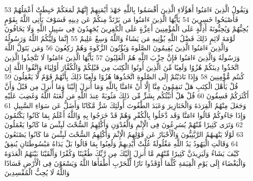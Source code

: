 {\tiny\colorbox{cl_aya}{53}} وَيَقُولُ الَّذِينَ ءَامَنُوا أَهَؤُلَاءِ الَّذِينَ أَقْسَمُوا بِاللَّهِ جَهْدَ أَيْمَنِهِمْ إِنَّهُمْ لَمَعَكُمْ حَبِطَتْ أَعْمَلُهُمْ فَأَصْبَحُوا خَسِرِينَ
{\tiny\colorbox{cl_aya}{54}} يَأَيُّهَا الَّذِينَ ءَامَنُوا مَن يَرْتَدَّ مِنكُمْ عَن دِينِهِ فَسَوْفَ يَأْتِى اللَّهُ بِقَوْمٍ يُحِبُّهُمْ وَيُحِبُّونَهُ أَذِلَّةٍ عَلَى الْمُؤْمِنِينَ أَعِزَّةٍ عَلَى الْكَفِرِينَ يُجَهِدُونَ فِى سَبِيلِ اللَّهِ وَلَا يَخَافُونَ لَوْمَةَ لَائِمٍ ذَلِكَ فَضْلُ اللَّهِ يُؤْتِيهِ مَن يَشَاءُ وَاللَّهُ وَسِعٌ عَلِيمٌ
{\tiny\colorbox{cl_aya}{55}} إِنَّمَا وَلِيُّكُمُ اللَّهُ وَرَسُولُهُ وَالَّذِينَ ءَامَنُوا الَّذِينَ يُقِيمُونَ الصَّلَوةَ وَيُؤْتُونَ الزَّكَوةَ وَهُمْ رَكِعُونَ
{\tiny\colorbox{cl_aya}{56}} وَمَن يَتَوَلَّ اللَّهَ وَرَسُولَهُ وَالَّذِينَ ءَامَنُوا فَإِنَّ حِزْبَ اللَّهِ هُمُ الْغَلِبُونَ
{\tiny\colorbox{cl_aya}{57}} يَأَيُّهَا الَّذِينَ ءَامَنُوا لَا تَتَّخِذُوا الَّذِينَ اتَّخَذُوا دِينَكُمْ هُزُوًا وَلَعِبًا مِّنَ الَّذِينَ أُوتُوا الْكِتَبَ مِن قَبْلِكُمْ وَالْكُفَّارَ أَوْلِيَاءَ وَاتَّقُوا اللَّهَ إِن كُنتُم مُّؤْمِنِينَ
{\tiny\colorbox{cl_aya}{58}} وَإِذَا نَادَيْتُمْ إِلَى الصَّلَوةِ اتَّخَذُوهَا هُزُوًا وَلَعِبًا ذَلِكَ بِأَنَّهُمْ قَوْمٌ لَّا يَعْقِلُونَ
{\tiny\colorbox{cl_aya}{59}} قُلْ يَأَهْلَ الْكِتَبِ هَلْ تَنقِمُونَ مِنَّا إِلَّا أَنْ ءَامَنَّا بِاللَّهِ وَمَا أُنزِلَ إِلَيْنَا وَمَا أُنزِلَ مِن قَبْلُ وَأَنَّ أَكْثَرَكُمْ فَسِقُونَ
{\tiny\colorbox{cl_aya}{60}} قُلْ هَلْ أُنَبِّئُكُم بِشَرٍّ مِّن ذَلِكَ مَثُوبَةً عِندَ اللَّهِ مَن لَّعَنَهُ اللَّهُ وَغَضِبَ عَلَيْهِ وَجَعَلَ مِنْهُمُ الْقِرَدَةَ وَالْخَنَازِيرَ وَعَبَدَ الطَّغُوتَ أُولَئِكَ شَرٌّ مَّكَانًا وَأَضَلُّ عَن سَوَاءِ السَّبِيلِ
{\tiny\colorbox{cl_aya}{61}} وَإِذَا جَاءُوكُمْ قَالُوا ءَامَنَّا وَقَد دَّخَلُوا بِالْكُفْرِ وَهُمْ قَدْ خَرَجُوا بِهِ وَاللَّهُ أَعْلَمُ بِمَا كَانُوا يَكْتُمُونَ
{\tiny\colorbox{cl_aya}{62}} وَتَرَى كَثِيرًا مِّنْهُمْ يُسَرِعُونَ فِى الْإِثْمِ وَالْعُدْوَنِ وَأَكْلِهِمُ السُّحْتَ لَبِئْسَ مَا كَانُوا يَعْمَلُونَ
{\tiny\colorbox{cl_aya}{63}} لَوْلَا يَنْهَىهُمُ الرَّبَّنِيُّونَ وَالْأَحْبَارُ عَن قَوْلِهِمُ الْإِثْمَ وَأَكْلِهِمُ السُّحْتَ لَبِئْسَ مَا كَانُوا يَصْنَعُونَ
{\tiny\colorbox{cl_aya}{64}} وَقَالَتِ الْيَهُودُ يَدُ اللَّهِ مَغْلُولَةٌ غُلَّتْ أَيْدِيهِمْ وَلُعِنُوا بِمَا قَالُوا بَلْ يَدَاهُ مَبْسُوطَتَانِ يُنفِقُ كَيْفَ يَشَاءُ وَلَيَزِيدَنَّ كَثِيرًا مِّنْهُم مَّا أُنزِلَ إِلَيْكَ مِن رَّبِّكَ طُغْيَنًا وَكُفْرًا وَأَلْقَيْنَا بَيْنَهُمُ الْعَدَوَةَ وَالْبَغْضَاءَ إِلَى يَوْمِ الْقِيَمَةِ كُلَّمَا أَوْقَدُوا نَارًا لِّلْحَرْبِ أَطْفَأَهَا اللَّهُ وَيَسْعَوْنَ فِى الْأَرْضِ فَسَادًا وَاللَّهُ لَا يُحِبُّ الْمُفْسِدِينَ
